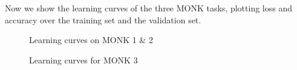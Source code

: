 Now we show the learning curves of the three MONK tasks, plotting loss and accuracy over the training set and the validation set.

\begin{figure}
    
    \centering
    \caption{Learning curves on MONK 1 \& 2}
    \label{fig:monk12}

\end{figure}



\begin{figure}
    \centering
    \caption{Learning curves for MONK 3}
\end{figure}


